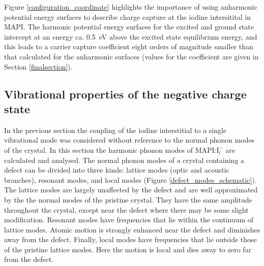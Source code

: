 Figure \ref{configuration_coordinate} highlights the importance of using anharmonic potential energy surfaces to describe charge capture at the iodine intersitital in MAPI. The harmonic potential energy surfaces for the excited and ground state intercept at an energy ca. \SI{0.5}{eV} above the excited state equilibrium energy, and this leads to a carrier capture coefficient eight orders of magnitude smaller than that calculated for the anharmonic surfaces (values for the coefficient are given in Section \ref{finalsection}).

\subsection{Vibrational properties of the negative charge state}

In the previous section the coupling of the iodine interstitial to a single vibrational mode was considered without reference to the normal phonon modes of the crystal.
In this section the harmonic phonon modes of MAPI:$\mathrm{I}_\mathrm{i}^-$ are calculated and analysed.
The normal phonon modes of a crystal containing a defect can be divided into three kinds: lattice modes (optic and acoustic branches), resonant modes, and local modes (Figure \ref{defect_modes_schematic}).\autocite{Hayes1985}
The lattice modes are largely unaffected by the defect and are well approximated by the the normal modes of the pristine crystal. They have the same amplitude throughout the crystal, except near the defect where there may be some slight modification. 
Resonant modes have frequencies that lie within the continuum of lattice modes. Atomic motion is strongly enhanced near the defect and diminishes away from the defect.
Finally, local modes have frequencies that lie outside those of the pristine lattice modes. Here the motion is local and dies away to zero far from the defect.

